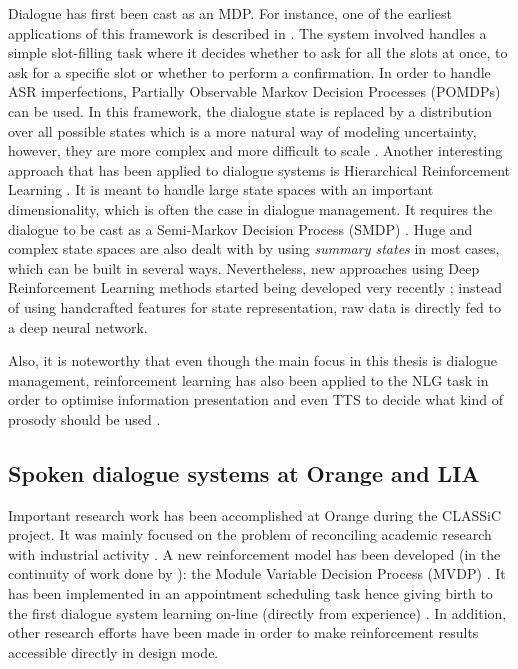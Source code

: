 		Dialogue has first been cast as an MDP. For instance, one of the earliest applications of this framework is described in \cite{Singh1999}. The system involved handles a simple slot-filling task where it decides whether to ask for all the slots at once, to ask for a specific slot or whether to perform a confirmation. In order to handle ASR imperfections, Partially Observable Markov Decision Processes (POMDPs) \cite{Roy2000,Williams2007,Young2010,Thomson2010} can be used. In this framework, the dialogue state is replaced by a distribution over all possible states which is a more natural way of modeling uncertainty, however, they are more complex and more difficult to scale \cite{Lemon2007}. Another interesting approach that has been applied to dialogue systems is Hierarchical Reinforcement Learning \cite{Cuayahuitl2007}. It is meant to handle large state spaces with an important dimensionality, which is often the case in dialogue management. It requires the dialogue to be cast as a Semi-Markov Decision Process (SMDP) \cite{Bradtke1994,Barto2003}. Huge and complex state spaces are also dealt with by using \textit{summary states} in most cases, which can be built in several ways. Nevertheless, new approaches using Deep Reinforcement Learning methods started being developed very recently \cite{Cuayahuitl2015}; instead of using handcrafted features for state representation, raw data is directly fed to a deep neural network.
		
		Also, it is noteworthy that even though the main focus in this thesis is dialogue management, reinforcement learning has also been applied to the NLG task in order to optimise information presentation \cite{Walker2000,Rieser2011b} and even TTS to decide what kind of prosody should be used \cite{Bretier2010}.
	
	\subsection{Spoken dialogue systems at Orange and LIA}

        	        Important research work has been accomplished at Orange during the CLASSiC project. It was mainly focused on the problem of reconciling academic research with industrial activity \cite{Paek2007}. A new reinforcement model has been developed (in the continuity of work done by \cite{Singh2002,Williams2008}): the Module Variable Decision Process (MVDP) \cite{Laroche2010a}. It has been implemented in an appointment scheduling task hence giving birth to the first dialogue system learning on-line (directly from experience) \cite{Putois2010}. In addition, other research efforts have been made in order to make reinforcement results accessible directly in design mode.

